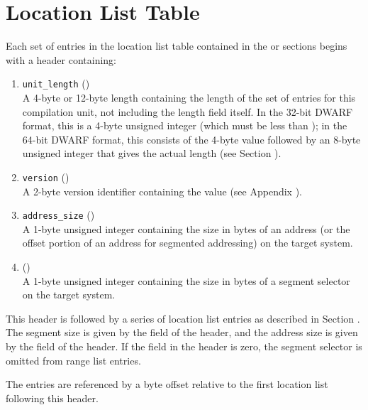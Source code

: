 \section{Location List Table}
\label{datarep:locationlisttable}
Each set of entries in the location list table contained in the
\dotdebugloc{} or \dotdebuglocdwo{} sections begins with a header containing:
\begin{enumerate}[1. ]
\item \texttt{unit\_length} () \\
A 4-byte or 12-byte length containing the length of
the set of entries for this compilation unit, not
including the length field itself. In the 32-bit
DWARF format, this is a 4-byte unsigned integer
(which must be less than \xfffffffzero); in the 64-bit
DWARF format, this consists of the 4-byte value
\wffffffff followed by an 8-byte unsigned integer
that gives the actual length (see 
Section ).

\item  \texttt{version} (\HFTuhalf) \\
A 2-byte version identifier containing the value
\versiondotdebugloc{} 
(see Appendix ).

\item	\texttt{address\_size} (\HFTubyte) \\
A 1-byte unsigned integer containing the size in
bytes of an address (or the offset portion of an
address for segmented addressing) on the target
system.

\item	\HFNsegmentselectorsize{} (\HFTubyte) \\
A 1-byte unsigned integer containing the size in
bytes of a segment selector on the target system.
\end{enumerate}

This header is followed by a series of location list entries as
described in Section .
The segment size is given by the
\HFNsegmentselectorsize{} field of the header, and the address size is
given by the \HFNaddresssize{} field of the header. If the
\HFNsegmentselectorsize{} field in the header is zero, the segment
selector is omitted from range list entries.

The entries are referenced by a byte offset relative to the first
location list following this header.

